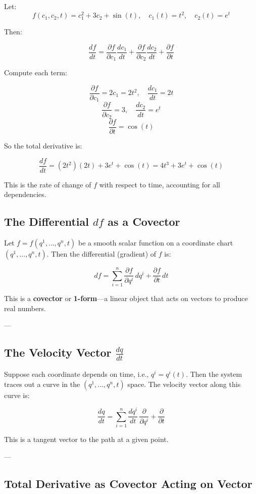 \documentclass{article}
\begin{document}
Let:
\[
f(c_1, c_2, t) = c_1^2 + 3c_2 + \sin(t), \quad c_1(t) = t^2, \quad c_2(t) = e^t
\]

Then:

\[
\frac{df}{dt} = \frac{\partial f}{\partial c_1} \frac{dc_1}{dt} + \frac{\partial f}{\partial c_2} \frac{dc_2}{dt} + \frac{\partial f}{\partial t}
\]

Compute each term:

\[
\frac{\partial f}{\partial c_1} = 2c_1 = 2t^2, \quad \frac{dc_1}{dt} = 2t
\]
\[
\frac{\partial f}{\partial c_2} = 3, \quad \frac{dc_2}{dt} = e^t
\]
\[
\frac{\partial f}{\partial t} = \cos(t)
\]

So the total derivative is:

\[
\frac{df}{dt} = (2t^2)(2t) + 3e^t + \cos(t) = 4t^3 + 3e^t + \cos(t)
\]

This is the rate of change of \( f \) with respect to time, accounting for all dependencies.

\subsection{The Differential \( df \) as a Covector}

Let \( f = f(q^1, \dots, q^n, t) \) be a smooth scalar function on a coordinate chart \( (q^1, \dots, q^n, t) \). Then the differential (gradient) of \( f \) is:

\[
df = \sum_{i=1}^n \frac{\partial f}{\partial q^i} \, dq^i + \frac{\partial f}{\partial t} \, dt
\]

This is a \textbf{covector} or \textbf{1-form}—a linear object that acts on vectors to produce real numbers.

---

\subsection{The Velocity Vector \( \frac{dq}{dt} \)}

Suppose each coordinate depends on time, i.e., \( q^i = q^i(t) \). Then the system traces out a curve in the \( (q^1, \dots, q^n, t) \) space. The velocity vector along this curve is:

\[
\frac{dq}{dt} = \sum_{i=1}^n \frac{dq^i}{dt} \, \frac{\partial}{\partial q^i} + \frac{\partial}{\partial t}
\]

This is a tangent vector to the path at a given point.

---

\subsection{Total Derivative as Covector Acting on Vector}
\end{document}
